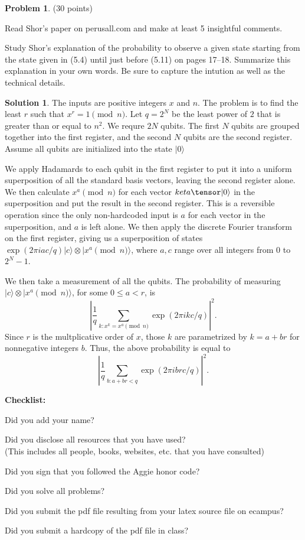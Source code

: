 \documentclass{article}
\theoremstyle{definition}
\newtheorem{problem}{Problem}
\newtheorem*{solution}{Solution}
\newcommand{\ket}[1]{|#1\rangle}
\newcommand{\checklist}{\noindent\textbf{Checklist:}
\begin{compactitem}[$\Box$] 
\item Did you add your name? 
\item Did you disclose all resources that you have used? \\
(This includes all people, books, websites, etc. that you have consulted)
\item Did you sign that you followed the Aggie honor code? 
\item Did you solve all problems? 
\item Did you submit the pdf file resulting from your latex source
  file on ecampus? 
\item Did you submit a hardcopy of the pdf file in class? 
\end{compactitem}
}
\begin{document}
\begin{problem} (30 points) 
\begin{compactenum}[(a)]
\item Read Shor's paper on perusall.com and make at least 5 insightful comments. 
\item Study Shor's explanation of the probability to observe a given state starting from the state given in (5.4) until just before (5.11) on pages 17--18. Summarize this explanation in your own words. Be sure to capture the intution as well as the technical details. 
\end{compactenum}
\end{problem}
\begin{solution}
The inputs are positive integers $x$ and $n$.  The problem is to find the least $r$ such that $x^r = 1 \pmod{n}$.  Let $q = 2^N$ be the least power of $2$ that is greater than or equal to $n^2$.  We requre $2N$ qubits.  The first $N$ qubits are grouped together into the first register, and the second $N$ qubits are the second register.  Assume all qubits are initialized into the state $\ket{0}$

We apply Hadamards to each qubit in the first register to put it into a uniform superposition of all the standard basis vectors, leaving the second register alone. We then calculate $x^a \pmod{n}$ for each vector $ket{a}\tensor \ket{0}$ in the superposition and put the result in the second register.  This is a reversible operation since the only non-hardcoded input is $a$ for each vector in the superposition, and $a$ is left alone. We then apply the discrete Fourier transform on the first register, giving us a superposition of states $\exp(2\pi i a c/q) \ket{c} \otimes \ket{x^a \pmod{n}}$, where $a,c$ range over all integers from $0$ to $2^N-1$.  

We then take a measurement of all the qubits.  The probability of measuring $\ket{c} \otimes \ket{x^a \pmod{n}}$, for some $0 \le a < r$, is
$$ \left| \frac{1}{q} \sum_{k: x^k = x^a \pmod{n}} \exp(2\pi i k c/q) \right|^2.$$ 
Since $r$ is the multplicative order of $x$, those $k$ are parametrized by $k = a + br$ for nonnegative integers $b$.  Thus, the above probability is equal to
$$ \left| \frac{1}{q} \sum_{b: a + br < q} \exp(2\pi i  b r c/q) \right|^2.$$ 



\end{solution}




\goodbreak
\checklist
\end{document}
